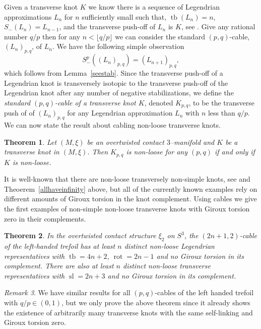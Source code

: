 \documentclass[11pt]{amsart}
\theoremstyle{plain}
\newtheorem{theorem}{Theorem}
\theoremstyle{definition}
\theoremstyle{remark}
\newtheorem{remark}[theorem]{Remark}
\numberwithin{theorem}{section}
\newcommand{\dfn}[1]{{\em #1}}        %
\DeclareMathOperator\tb{tb}                   %
\DeclareMathOperator\rot{rot}                 %
\DeclareMathOperator\self{sl}                 %
\begin{document}
Given a transverse knot $K$ we know there is a sequence of Legendrian approximations $L_n$ for $n$ sufficiently small such that, $\tb(L_n)=n$,  $S_-(L_n)=L_{n-1}$, and the transverse push-off of $L_n$ is $K$, see \cite[Section~2.2]{EtnyreHonda01}. Give any rational number $q/p$ then for any $n< \lfloor q/p\rfloor$ we can consider the standard $(p,q)$-cable, $(L_n)_{p,q}$, of $L_n$. We have the following simple observation
\begin{equation}
S^p_-((L_{n})_{p,q})=(L_{n+1})_{p,q},
\end{equation}
which follows from Lemma~\ref{seestab}. Since the transverse push-off of a Legendrian knot is transversely isotopic to the transverse push-off of the Legendrian knot after any number of negative stabilizations, we define the \dfn{standard $(p,q)$-cable of a transverse knot $K$}, denoted $K_{p,q}$, to be the transverse push of of $(L_n)_{p,q}$ for any Legendrian approximation $L_n$ with $n$ less than $q/p$. We can now state the result about cabling non-loose transverse knots.

\begin{theorem}\label{transversecable}
Let $(M,\xi)$ be an overtwisted contact $3$--manifold and $K$ be a transverse knot in $(M,\xi)$. Then $K_{p,q}$ is non-loose for any $(p,q)$ if and only if $K$ is non-loose. 
\end{theorem}

It is well-known that there are non-loose transversely non-simple knots, see \cite{Etnyre13} and Theoerem~\ref{allhaveinfinity} above, but all of the currently known examples rely on different amounts of Giroux torsion in the knot complement. Using cables we give the first examples of non-simple non-loose transverse knots with Giroux torsion zero in their complements. 

\begin{theorem}\label{thm:transnonsimple}
In the overtwisted contact structure $\xi_2$ on $S^3$, the $(2n+1,2)$-cable of the left-handed trefoil has at least $n$ distinct non-loose Legendrian representatives with $\tb = 4n+2$, $\rot = 2n-1$ and no Giroux torsion in its complement. There are also at least $n$ distinct non-loose transverse representatives with $\self=2n+3$ and no Giroux torsion in its complement. 
\end{theorem}

\begin{remark}
We have similar results for all $(p,q)$-cables of the left handed trefoil with $q/p\in (0,1)$, but we only prove the above theorem since it already shows the existence of arbitrarily many transverse knots with the same self-linking and Giroux torsion zero. 
\end{remark}
\end{document}
